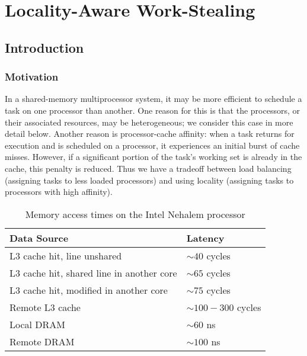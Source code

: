 
\part{Locality-Aware Work-Stealing}
\label{part:locality}

\chapter{Introduction}
\label{chap:locality-introduction}

\section{Motivation}
\label{sec:locality-intro-motivation}

In a shared-memory multiprocessor system, it may be more efficient to
schedule a task on one processor than another. One reason for this is
that the processors, or their associated resources, may be
heterogeneous; we consider this case in more detail below. Another
reason is processor-cache affinity: when a task returns for execution
and is scheduled on a processor, it experiences an initial burst of
cache misses. However, if a significant portion of the task's working
set is already in the cache, this penalty is reduced. Thus we have a
tradeoff between load balancing (assigning tasks to less loaded
processors) and using locality (assigning tasks to processors with
high affinity).

\begin{table}[htb]
  \centering
  \begin{tabular}{ll}
    \toprule
    Data Source & Latency \\\midrule
    L3 cache hit, line unshared & $\sim 40$ cycles\\
    L3 cache hit, shared line in another core\hspace{0.5cm} & $\sim 65$ cycles \\
    L3 cache hit, modified in another core & $\sim 75$ cycles \\
    Remote L3 cache & $\sim 100 - 300$ cycles \\
    Local DRAM & $\sim 60$ ns \\
    Remote DRAM & $\sim 100$ ns \\\bottomrule
  \end{tabular}
  \caption[Memory access times on the Intel Nehalem processor]
  {Memory access times on the Intel Nehalem processor}
  \label{tab:locality-introduction-memory-access-times}
\end{table}

